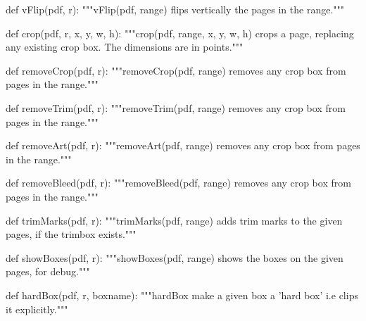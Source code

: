 def vFlip(pdf, r):
    """vFlip(pdf, range) flips vertically the pages in the range."""

def crop(pdf, r, x, y, w, h):
    """crop(pdf, range, x, y, w, h) crops a page, replacing any existing
    crop box. The dimensions are in points."""

def removeCrop(pdf, r):
    """removeCrop(pdf, range) removes any crop box from pages in the range."""

def removeTrim(pdf, r):
    """removeTrim(pdf, range) removes any crop box from pages in the range."""

def removeArt(pdf, r):
    """removeArt(pdf, range) removes any crop box from pages in the range."""

def removeBleed(pdf, r):
    """removeBleed(pdf, range) removes any crop box from pages in the range."""

def trimMarks(pdf, r):
    """trimMarks(pdf, range) adds trim marks to the given pages, if the trimbox
    exists."""

def showBoxes(pdf, r):
    """showBoxes(pdf, range) shows the boxes on the given pages, for debug."""

def hardBox(pdf, r, boxname):
    """hardBox make a given box a 'hard box' i.e clips it explicitly."""
